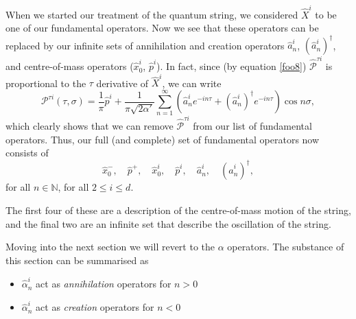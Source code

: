 \documentclass[a4paper,12pt]{article}
\numberwithin{equation}{section}
\begin{document}
When we started our treatment of the quantum string, we considered $\hat{X}^i$ to be one of our fundamental operators. Now we see that these operators can be replaced by our infinite sets of annihilation and creation operators $\hat{a}_n^i$, $(\hat{a}_n^i)^\dagger$, and centre-of-mass operators ($\hat{x}_0^i$, $\hat{p}^i$). In fact, since (by equation \ref{foo8}) $\hat{\mathcal{P}}^{\tau i}$ is proportional to the $\tau$ derivative of $\hat{X}^i$, we can write
\begin{equation}
\mathcal{P}^{\tau i}(\tau,\sigma) = \frac{1}{\pi}\hat{p}^i +\frac{1}{\pi\sqrt{2\alpha'}}\sum_{n=1}^\infty\left(\hat{a}_n^ie^{-in\tau}+(\hat{a}_n^i)^\dagger e^{-in\tau}\right)\cos{n\sigma},
\end{equation}
which clearly shows that we can remove $\hat{\mathcal{P}}^{\tau i}$ from our list of fundamental operators. Thus, our full (and complete) set of fundamental operators now consists of
\begin{equation}
\hat{x}_0^-,\quad \hat{p}^+,\quad \hat{x}_0^i,\quad \hat{p}^i, \quad \hat{a}_n^i, \quad (\hat{a}_n^i)^\dagger,
\end{equation}
for all $n \in \mathbb{N}$, for all $2\leq i\leq d$. 

The first four of these are a description of the centre-of-mass motion of the string, and the final two are an infinite set that describe the oscillation of the string.

Moving into the next section we will revert to the $\alpha$ operators. The substance of this section can be summarised as 
\begin{itemize}
\item{$\hat{\alpha}_n^i$ act as \emph{annihilation} operators for $n>0$}
\item{$\hat{\alpha}_n^i$ act as \emph{creation} operators for $n<0$}
\end{itemize}
\end{document}
